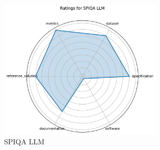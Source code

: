 \documentclass{article}
\begin{document}
\begin{figure}[h!]
  \centering
  \includegraphics[width=0.7\textwidth]{SPIQA LLM_radar.pdf}
  \caption{SPIQA LLM}
\end{figure}
\end{document}
